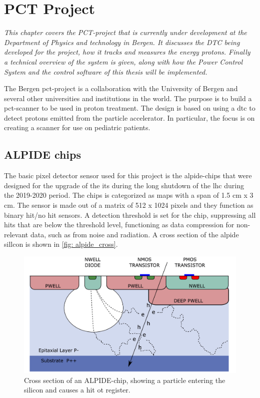 \documentclass[main.tex]{subfiles}
\begin{document}
\section{PCT Project
}
\textit{This chapter covers the PCT-project that is currently under development at the Department of Physics and technology in Bergen. It discusses the DTC being developed for the project, how it tracks and measures the energy protons. Finally a technical overview of the system is given, along with how the Power Control System and the control software of this thesis will be implemented.}

The Bergen \gls{pct}-project is a collaboration with the University of Bergen and several other universities and institutions in the world. The purpose is to build a \gls{pct}-scanner to be used in proton treatment. The design is based on using a \acrfull{dtc} to detect protons emitted from the particle accelerator. In particular, the focus is on creating a scanner for use on pediatric patients.

\subsection{ALPIDE chips}

The basic pixel detector sensor used for this project is the \gls{alpide}-chips that were designed for the upgrade of the \gls{its} during the long shutdown of the \gls{lhc} during the 2019-2020 period. The chips is categorized as \gls{maps} with a span of 1.5 cm x 3 cm. The sensor is made out of a matrix of 512 x 1024 pixels and they function as binary hit/no hit sensors. A detection threshold is set for the chip, suppressing all hits that are below the threshold level, functioning as data compression for non-relevant data, such as from noise and radiation. A cross section of the \gls{alpide} sillcon is shown in \autoref{fig: alpide_cross}.

\begin{figure}[!htpb]
    \centering
    \includegraphics[width=12cm]{images/alpide_chip.jpg}
    \caption{Cross section of an ALPIDE-chip, showing a particle entering the silicon and causes a hit ot register.}
    \label{fig: alpide_cross}
\end{figure}
\FloatBarrier
\end{document}
